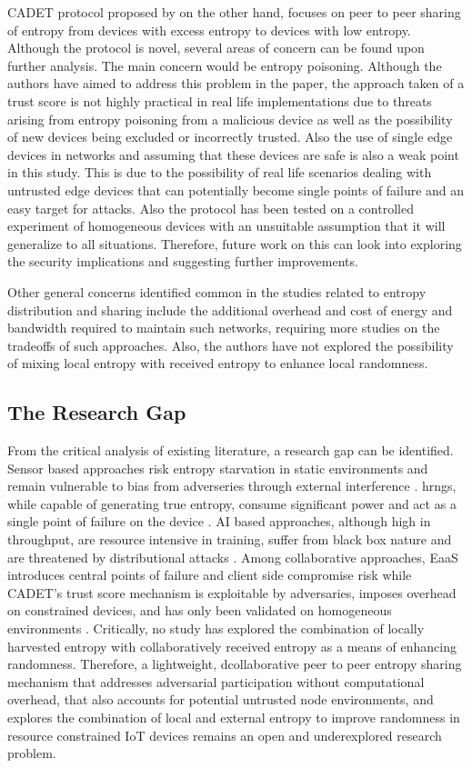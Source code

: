 \documentclass[a4paper, 12pt]{article}
\begin{document}
\ac{CADET} protocol proposed by \cite{wallace2018} on the other hand, focuses on peer to peer sharing of entropy from devices with excess entropy to devices with low entropy. Although the protocol is novel, several areas of concern can be found upon further analysis. The main concern would be entropy poisoning. Although the authors have aimed to address this problem in the paper, the approach taken of a trust score is not highly practical in real life implementations due to threats arising from entropy poisoning from a malicious device as well as the possibility of new devices being excluded or incorrectly trusted. Also the use of single edge devices in networks and assuming that these devices are safe is also a weak point in this study. This is due to the possibility of real life scenarios dealing with untrusted edge devices that can potentially become single points of failure and an easy target for attacks. Also the protocol has been tested on a controlled experiment of homogeneous devices with an unsuitable assumption that it will generalize to all situations. Therefore, future work on this can look into exploring the security implications and suggesting further improvements.

Other general concerns identified common in the studies related to entropy distribution and sharing include the additional overhead and cost of energy and bandwidth required to maintain such networks, requiring more studies on the tradeoffs of such approaches. Also, the authors have not explored the possibility of mixing local entropy with received entropy to enhance local randomness.

\subsection{The Research Gap}
From the critical analysis of existing literature, a research gap can be identified. Sensor based approaches risk entropy starvation in static environments and remain vulnerable to bias from adverseries through external interference \citep{Ullah2020PerCom} \citep{hennebert2021entropy}. hrngs, while capable of generating true entropy, consume significant power and act as a single point of failure on the device \citep{espressif_esp32_trm_5_6}. AI based approaches, although high in throughput, are resource intensive in training, suffer from black box nature and are threatened by distributional attacks \citep{TRIM_RNG} \citep{Fei2025EPRNG}. Among collaborative approaches, EaaS introduces central points of failure and client side compromise risk \citep{vassilev2019eaas} while CADET's trust score mechanism is exploitable by adversaries, imposes overhead on constrained devices, and has only been validated on homogeneous environments \citep{wallace2018}. Critically, no study has explored the combination of locally harvested entropy with collaboratively received entropy as a means of enhancing randomness. Therefore, a lightweight, dcollaborative peer to peer entropy sharing mechanism that addresses adversarial participation without computational overhead, that also accounts for potential untrusted node environments, and explores the combination of local and external entropy to improve randomness in resource constrained IoT devices remains an open and underexplored research problem.
\end{document}
